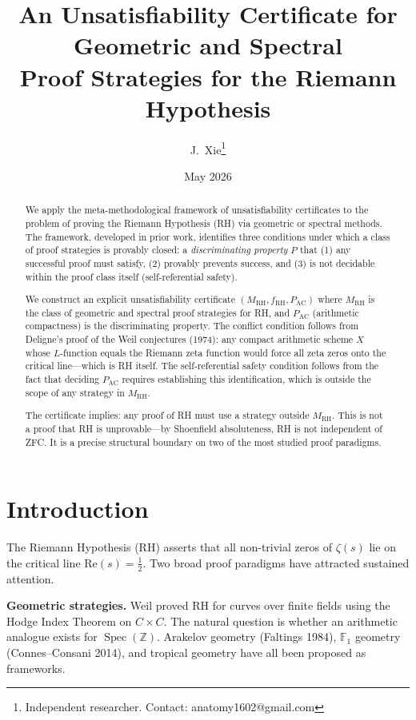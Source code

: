 \documentclass[12pt]{article}
\title{An Unsatisfiability Certificate for Geometric and Spectral\\
Proof Strategies for the Riemann Hypothesis}
\author{J.~Xie\thanks{Independent researcher. Contact: anatomy1602@gmail.com}}
\date{May 2026}
\DeclareMathOperator{\Spec}{Spec}
\newcommand{\ZZ}{\mathbb{Z}}
\begin{document}
\maketitle

\begin{abstract}
We apply the meta-methodological framework of unsatisfiability certificates
to the problem of proving the Riemann Hypothesis (RH) via geometric or
spectral methods. The framework, developed in prior work, identifies three
conditions under which a class of proof strategies is provably closed: a
\emph{discriminating property} $P$ that (1) any successful proof must
satisfy, (2) provably prevents success, and (3) is not decidable within
the proof class itself (self-referential safety).

We construct an explicit unsatisfiability certificate $(M_{\mathrm{RH}},
f_{\mathrm{RH}}, P_{\mathrm{AC}})$ where $M_{\mathrm{RH}}$ is the class
of geometric and spectral proof strategies for RH, and $P_{\mathrm{AC}}$
(arithmetic compactness) is the discriminating property. The conflict
condition follows from Deligne's proof of the Weil conjectures (1974):
any compact arithmetic scheme $X$ whose $L$-function equals the Riemann
zeta function would force all zeta zeros onto the critical line---which
is RH itself. The self-referential safety condition follows from the fact
that deciding $P_{\mathrm{AC}}$ requires establishing this identification,
which is outside the scope of any strategy in $M_{\mathrm{RH}}$.

The certificate implies: any proof of RH must use a strategy outside
$M_{\mathrm{RH}}$. This is not a proof that RH is unprovable---by
Shoenfield absoluteness, RH is not independent of ZFC. It is a precise
structural boundary on two of the most studied proof paradigms.
\end{abstract}

\tableofcontents
\newpage

\section{Introduction}
The Riemann Hypothesis (RH) asserts that all non-trivial zeros of
$\zeta(s)$ lie on the critical line $\mathrm{Re}(s) = \tfrac{1}{2}$.
Two broad proof paradigms have attracted sustained attention.

\textbf{Geometric strategies.} Weil proved RH for curves over finite
fields using the Hodge Index Theorem on $C \times C$. The natural
question is whether an arithmetic analogue exists for $\Spec(\ZZ)$.
Arakelov geometry (Faltings 1984), $\mathbb{F}_1$ geometry
(Connes--Consani 2014), and tropical geometry have all been proposed
as frameworks.
\end{document}
